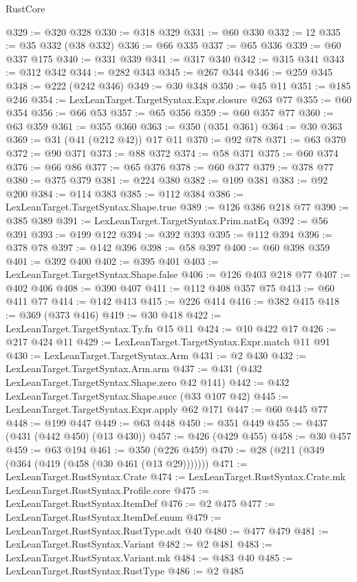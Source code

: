 \begin{lexlean}{RustCore}
\begin{coremodule}
@329 := @320 @328
@330 := @318 @329
@331 := @60 @330
@332 := 12
@335 := @35 @332 (@38 @332)
@336 := @66 @335
@337 := @65 @336
@339 := @60 @337 @175
@340 := @331 @339
@341 := @317 @340
@342 := @315 @341
@343 := @312 @342
@344 := @282 @343
@345 := @267 @344
@346 := @259 @345
@348 := @222 (@242 @346)
@349 := @30 @348
@350 := @45 @11
@351 := @185 @246
@354 := LexLeanTarget.TargetSyntax.Expr.closure @263 @77
@355 := @60 @354
@356 := @66 @53
@357 := @65 @356
@359 := @60 @357 @77
@360 := @63 @359
@361 := @355 @360
@363 := @350 (@351 @361)
@364 := @30 @363
@369 := @31 (@41 (@212 @42)) @17 @11
@370 := @92 @78
@371 := @63 @370
@372 := @90 @371
@373 := @88 @372
@374 := @58 @371
@375 := @60 @374
@376 := @66 @86
@377 := @65 @376
@378 := @60 @377
@379 := @378 @77
@380 := @375 @379
@381 := @224 @380
@382 := @109 @381
@383 := @92 @200
@384 := @114 @383
@385 := @112 @384
@386 := LexLeanTarget.TargetSyntax.Shape.true
@389 := @126 @386 @218 @77
@390 := @385 @389
@391 := LexLeanTarget.TargetSyntax.Prim.natEq
@392 := @56 @391
@393 := @199 @122
@394 := @392 @393
@395 := @112 @394
@396 := @378 @78
@397 := @142 @396
@398 := @58 @397
@400 := @60 @398 @359
@401 := @392 @400
@402 := @395 @401
@403 := LexLeanTarget.TargetSyntax.Shape.false
@406 := @126 @403 @218 @77
@407 := @402 @406
@408 := @390 @407
@411 := @112 @408 @357 @75
@413 := @60 @411 @77
@414 := @142 @413
@415 := @226 @414
@416 := @382 @415
@418 := @369 (@373 @416)
@419 := @30 @418
@422 := LexLeanTarget.TargetSyntax.Ty.fn @15 @11
@424 := @10 @422 @17
@426 := @217 @424 @11
@429 := LexLeanTarget.TargetSyntax.Expr.match @11 @91
@430 := LexLeanTarget.TargetSyntax.Arm
@431 := @2 @430
@432 := LexLeanTarget.TargetSyntax.Arm.arm
@437 := @431 (@432 LexLeanTarget.TargetSyntax.Shape.zero @42 @141)
@442 := @432 LexLeanTarget.TargetSyntax.Shape.succ (@33 @107 @42)
@445 := LexLeanTarget.TargetSyntax.Expr.apply @62 @171
@447 := @60 @445 @77
@448 := @199 @447
@449 := @63 @448
@450 := @351 @449
@455 := @437 (@431 (@442 @450) (@13 @430))
@457 := @426 (@429 @455)
@458 := @30 @457
@459 := @63 @194
@461 := @350 (@226 @459)
@470 := @28 (@211 (@349 (@364 (@419 (@458 (@30 @461 (@13 @29)))))))
@471 := LexLeanTarget.RustSyntax.Crate
@474 := LexLeanTarget.RustSyntax.Crate.mk LexLeanTarget.RustSyntax.Profile.core
@475 := LexLeanTarget.RustSyntax.ItemDef
@476 := @2 @475
@477 := LexLeanTarget.RustSyntax.ItemDef.enum
@479 := LexLeanTarget.RustSyntax.RustType.adt @40
@480 := @477 @479
@481 := LexLeanTarget.RustSyntax.Variant
@482 := @2 @481
@483 := LexLeanTarget.RustSyntax.Variant.mk
@484 := @483 @40
@485 := LexLeanTarget.RustSyntax.RustType
@486 := @2 @485

\end{coremodule}
\end{lexlean}

